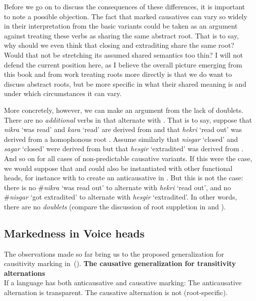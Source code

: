 Before we go on to discuss the consequences of these differences, it is important to note a possible objection. The fact that marked causatives can vary so widely in their interpretation from the basic variants could be taken as an argument against treating these verbs as sharing the same abstract root. That is to say, why should we even think that closing and extraditing share the same root? Would that not be stretching its assumed shared semantics too thin? I will not defend the current position here, as I believe the overall picture emerging from this book and from work treating roots more directly is that we do want to discuss abstract roots, but be more specific in what their shared meaning is and under which circumstances it can vary.

More concretely, however, we can make an argument from the lack of doublets. There are no \emph{additional} verbs in {\tnif} that alternate with {\thif}. That is to say, suppose that \emph{nikra} `was read' and \emph{kara} `read' are derived from  and that \emph{hekri} `read out' was derived from a homophonous root . Assume similarly that \emph{nisgar} `closed' and \emph{sagar} `closed' were derived from  but that \emph{hesgir} `extradited' was derived from . And so on for all cases of non-predictable causative variants. If this were the case, we would suppose that  and  could also be instantiated with other functional heads, for instance with {\vz} to create an anticausative in {\tnif}. But this is not the case: there is no \#\emph{nikra} `was read out' to alternate with \emph{hekri} `read out', and no \#\emph{nisgar} `got extradited' to alternate with \emph{hesgir} `extradited'. In other words, there are no \emph{doublets} (compare the discussion of root suppletion in \citealt{harley14thlia,harley14thlib,harley15roots} and \citealt{borer14thli}).

		\subsection{Markedness in Voice heads} \label{vd:caus:markvoice}
The observations made so far bring us to the proposed generalization for causitivity marking in~(\nextx).
\pex\label{ex:vd:causgen}\textbf{The causative generalization for transitivity alternations}\\
	If a language has both anticausative and causative marking:
	\a The anticausative alternation is transparent.
	\a The causative alternation is not (root-specific).
\xe

